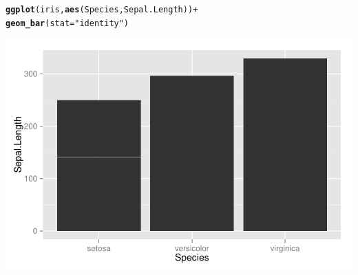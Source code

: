\documentclass{beamer}\usepackage[]{graphicx}\usepackage[]{color}
\makeatletter
\newcommand{\hlstr}[1]{\textcolor[rgb]{0.192,0.494,0.8}{#1}}%
\newcommand{\hlopt}[1]{\textcolor[rgb]{0,0,0}{#1}}%
\newcommand{\hlstd}[1]{\textcolor[rgb]{0.345,0.345,0.345}{#1}}%
\newcommand{\hlkwc}[1]{\textcolor[rgb]{0.333,0.667,0.333}{#1}}%
\newcommand{\hlkwd}[1]{\textcolor[rgb]{0.737,0.353,0.396}{\textbf{#1}}}%
\newenvironment{kframe}{%
 \def\at@end@of@kframe{}%
 \ifinner\ifhmode%
  \def\at@end@of@kframe{\end{minipage}}%
  \begin{minipage}{\columnwidth}%
 \fi\fi%
 \def\FrameCommand##1{\hskip\@totalleftmargin \hskip-\fboxsep
 \colorbox{shadecolor}{##1}\hskip-\fboxsep
     \hskip-\linewidth \hskip-\@totalleftmargin \hskip\columnwidth}%
 \MakeFramed {\advance\hsize-\width
   \@totalleftmargin\z@ \linewidth\hsize
   \@setminipage}}%
 {\par\unskip\endMakeFramed%
 \at@end@of@kframe}
\newenvironment{knitrout}{}{} %
\makeatother
\begin{document}
\begin{frame}[fragile]
\begin{knitrout}\footnotesize
{}\color{fgcolor}\begin{kframe}
\begin{alltt}
\hlkwd{ggplot}\hlstd{(iris,} \hlkwd{aes}\hlstd{(Species, Sepal.Length))} \hlopt{+}
\hlkwd{geom_bar}\hlstd{(}\hlkwc{stat} \hlstd{=} \hlstr{"identity"}\hlstd{)}
\end{alltt}
\end{kframe}

{\centering \includegraphics[width=.75\linewidth]{figure/barone} 

}



\end{knitrout}

\end{frame}

\end{document}
